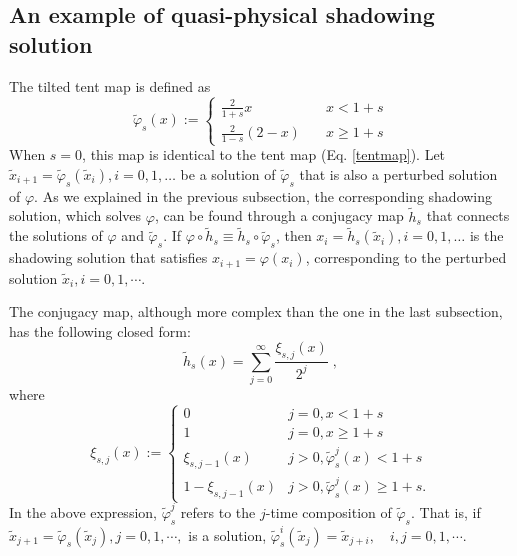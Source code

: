 \subsection{An example of quasi-physical shadowing solution}
\label{sec:sub:quasi-physical-shadow}
The tilted tent map is defined as
\begin{equation} \label{tent_tilted}
    \tilde\varphi_s(x) := \begin{cases}
    \frac2{1+s} x \quad & x < 1+s \\
    \frac2{1-s}(2-x) \quad & x \ge 1+s
    \end{cases}
\end{equation}
When $s=0$, this map is identical to the tent map (Eq. \ref{tentmap}).
Let $\tilde{x}_{i+1}=\tilde\varphi_s(\tilde{x}_i), i=0,1,\ldots$ be a solution of 
$\tilde{\varphi}_s$ that is also a perturbed solution of $\varphi$.
As we explained in the previous subsection,
the corresponding 
shadowing solution, which solves $\varphi$, can be found through a conjugacy map $\tilde{h}_s$ that connects the solutions of $\varphi$ and $\tilde{\varphi}_s$.
If $\varphi\circ \tilde{h}_s \equiv \tilde{h}_s\circ\tilde\varphi_s$,
then $x_i=\tilde{h}_s(\tilde{x}_i), i=0,1,\ldots$ is the shadowing solution 
that satisfies $x_{i+1} = \varphi(x_i)$, corresponding to the perturbed solution 
$\tilde{x}_i,i=0,1,\cdots$.

The conjugacy map, although more complex than the one
in the last subsection, has the following closed form:
\begin{equation} \label{conjugate_tilted}
    \tilde{h}_s(x) = \sum_{j=0}^{\infty} \frac{\xi_{s,j}(x)}{2^j}\;,
\end{equation}
where
\begin{equation} \label{conjugate_tilted_helper}
    \xi_{s,j}(x) := \begin{cases}
    0 & j=0, x<1+s \\
    1 & j=0, x\ge 1+s \\
    \xi_{s,j-1}(x) & j>0, \tilde\varphi_s^j(x) < 1+s \\
    1 - \xi_{s,j-1}(x) & j>0, \tilde\varphi_s^j(x) \ge 1+s.
    \end{cases}
\end{equation}
In the above expression, $\tilde{\varphi}^j_s$ refers to the $j$-time 
composition of $\tilde{\varphi}_s.$ That is, if $\tilde{x}_{j+1} = \tilde{\varphi}_s(\tilde{x}_j), j = 0,1,\cdots,$ is a solution, $\tilde{\varphi}_s^i(\tilde{x}_j) = \tilde{x}_{j+i},\quad i,j = 0,1,\cdots$. 

